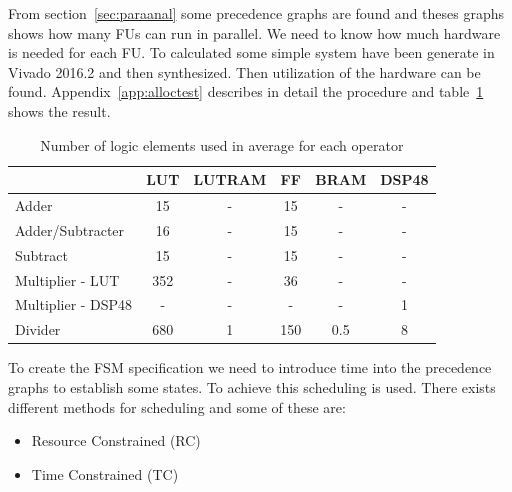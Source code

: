 From section~\vref{sec:paraanal} some precedence graphs are found and theses graphs shows how many FUs can run in parallel. We need to know how much hardware is needed for each FU. To calculated some simple system have been generate in Vivado 2016.2 and then synthesized. Then utilization of the hardware can be found. Appendix~\vref{app:alloctest} describes in detail the procedure and table~\ref{tab:utilizationofelements} shows the result.
\begin{table}[ht!]
\centering
\begin{tabular}{l | c c c c c }
  \toprule
   &  LUT & LUTRAM & FF & BRAM & DSP48 \\
  \midrule
  Adder & 15 & - & 15 & - & - \\
  Adder/Subtracter  & 16 & - & 15 & - & - \\
  Subtract  & 15 & - & 15 & - & - \\
  Multiplier - LUT  & 352 & - & 36 & - & - \\
  Multiplier - DSP48 & - & - & - & - & 1 \\
  Divider & 680 & 1 & 150 & 0.5 & 8 \\
  \bottomrule
\end{tabular}
\caption{Number of logic elements used in average for each operator}
\label{tab:utilizationofelements}
\end{table}

To create the FSM specification we need to introduce time into the precedence graphs to establish some states. To achieve this scheduling is used. There exists different methods for scheduling and some of these are:
\begin{itemize}
  \item Resource Constrained (RC)
  \item Time Constrained (TC)
\end{itemize}

